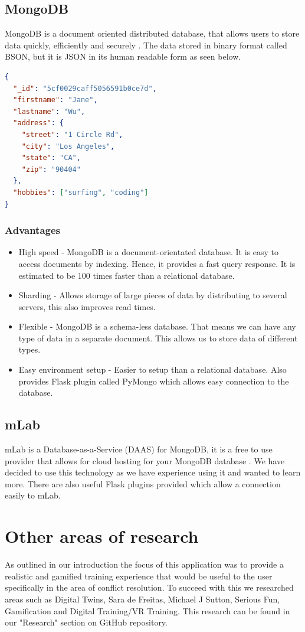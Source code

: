 \subsection{MongoDB}
MongoDB is a document oriented distributed database, that allows users to store data quickly, efficiently and securely \cite{mongodb}. The data stored in binary format called BSON, but it is JSON in its human readable form as seen below.

\begin{lstlisting}[language=JSON]
{
  "_id": "5cf0029caff5056591b0ce7d",
  "firstname": "Jane",
  "lastname": "Wu",
  "address": {
    "street": "1 Circle Rd",
    "city": "Los Angeles",
    "state": "CA",
    "zip": "90404"
  },
  "hobbies": ["surfing", "coding"]
}
\end{lstlisting}

\subsubsection{Advantages}
\begin{itemize}
    \item High speed - MongoDB is a document-orientated database. It is easy to access documents by indexing. Hence, it provides a fast query response. It is estimated to be 100 times faster than a relational database.
    \item Sharding - Allows storage of large pieces of data by distributing to several servers, this also improves read times.
    \item Flexible - MongoDB is a schema-less database. That means we can have any type of data in a separate document. This allows us to store data of different types.
    \item Easy environment setup - Easier to setup than a relational database. Also provides Flask plugin called PyMongo which allows easy connection to the database.
\end{itemize}

\subsection{mLab}
mLab is a Database-as-a-Service (DAAS) for MongoDB, it is a free to use provider that allows for cloud hosting for your MongoDB database \cite{mlab}. We have decided to use this technology as we have experience using it and wanted to learn more. There are also useful Flask plugins provided which allow a connection easily to mLab.

\section{Other areas of research}
As outlined in our introduction the focus of this application was to provide a realistic and gamified training experience that would be useful to the user specifically in the area of conflict resolution. To succeed with this we researched areas such as Digital Twins, Sara de Freitas, Michael J Sutton, Serious Fun, Gamification and Digital Training/VR Training. This research can be found in our "Research" section on GitHub repository.